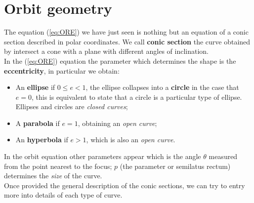 \section{Orbit geometry}
The equation (\ref{eq:ORE}) we have just seen is nothing but an equation of a conic section described in polar coordinates. We call \textbf{conic section} the curve obtained by intersect a cone with a plane with different angles of inclination.   \\
In the (\ref{eq:ORE}) equation the parameter which determines the shape is the \textbf{eccentricity}, in particular we obtain: 
\begin{itemize}
    \item An \textbf{ellipse} if $0 \le e < 1$, the ellipse collapses into a \textbf{circle} in the case that $e=0$, this is equivalent to state that a circle is a particular type of ellipse. Ellipses and circles are \textit{closed curves};
    \item A \textbf{parabola} if $e=1$, obtaining an \textit{open curve}; 
    \item An \textbf{hyperbola} if $e>1$, which is also an \textit{open curve}.
\end{itemize}
In the orbit equation other parameters appear which is the angle $\theta$ measured from the point nearest to the focus; $p$ (the parameter or semilatus rectum) determines the \textit{size} of the curve. \\
Once provided the general description of the conic sections, we can try to entry more into details of each type of curve.

